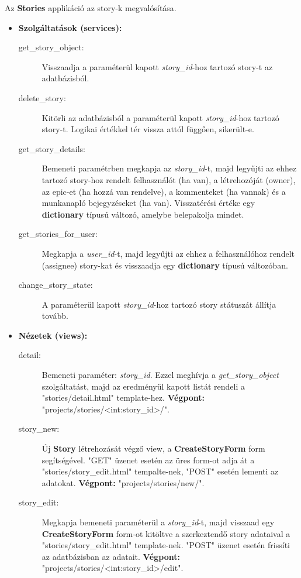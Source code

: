 Az \textbf{Stories} applikáció az story-k megvalósítása. 

\begin{itemize}
	\item \textbf{Szolgáltatások (services):}
	\begin{description}
		\item[get\_story\_object:] Visszaadja a paraméterül kapott \textit{story\_id}-hoz tartozó story-t az adatbázisból.
		\item[delete\_story:] Kitörli az adatbázisból a paraméterül kapott \textit{story\_id}-hoz tartozó story-t. Logikai értékkel tér vissza attól függően, sikerült-e.
		\item[get\_story\_details:] Bemeneti paramétrben megkapja az  \textit{story\_id}-t, majd legyűjti az ehhez tartozó story-hoz rendelt felhasználót (ha van), a létrehozóját (owner), az epic-et (ha hozzá van rendelve), a kommenteket (ha vannak) és a munkanapló bejegyzéseket (ha van). Visszatérési értéke egy \textbf{dictionary} típusú változó, amelybe belepakolja mindet.
		\item[get\_stories\_for\_user:] Megkapja a \textit{user\_id}-t, majd legyűjti az ehhez a felhasználóhoz rendelt (assignee) story-kat és visszaadja egy \textbf{dictionary} típusú változóban.
		\item[change\_story\_state:] A paraméterül kapott \textit{story\_id}-hoz tartozó story státuszát állítja tovább.
	\end{description}
	\item \textbf{Nézetek (views):}
	\begin{description}
		\item[detail:] Bemeneti paraméter: \textit{story\_id}. Ezzel meghívja a \textit{get\_story\_object} szolgáltatást, majd az eredményül kapott listát rendeli a "stories/detail.html" template-hez. \textbf{Végpont:} "projects/stories/<int:story\_id>/".
		\item[story\_new:] Új \textbf{Story} létrehozását végző view, a \textbf{CreateStoryForm} form segítségével. "GET" üzenet esetén az üres form-ot adja át a "stories/story\_edit.html" tempalte-nek, "POST" esetén lementi az adatokat. \textbf{Végpont:} "projects/stories/new/".
		\item[story\_edit:] Megkapja bemeneti paraméterül a \textit{story\_id}-t, majd visszaad egy \textbf{CreateStoryForm} form-ot kitöltve a szerkeztendő story adataival a "stories/story\_edit.html" template-nek. "POST" üzenet esetén frissíti az adatbázisban az adatait. \textbf{Végpont:} "projects/stories/<int:story\_id>/edit".

\end{description}
\end{itemize}
